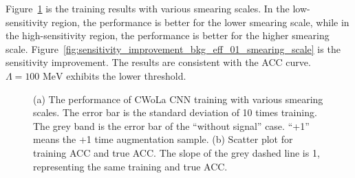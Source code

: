 \documentclass[12pt]{article}
\begin{document}
		Figure~\ref{fig:cwola_cnn_training_performance_smearing_scale} is the training results with various smearing scales. In the low-sensitivity region, the performance is better for the lower smearing scale, while in the high-sensitivity region, the performance is better for the higher smearing scale. Figure~\ref{fig:sensitivity_improvement_bkg_eff_01_smearing_scale} is the sensitivity improvement. The results are consistent with the ACC curve. $\Lambda = \text{100 MeV}$ exhibits the lower threshold.
		\begin{figure}[htpb]
			\centering
			\caption{(a) The performance of CWoLa CNN training with various smearing scales. The error bar is the standard deviation of 10 times training. The grey band is the error bar of the ``without signal'' case. ``+1'' means the +1 time augmentation sample. (b) Scatter plot for training ACC and true ACC. The slope of the grey dashed line is 1, representing the same training and true ACC.}
			\label{fig:cwola_cnn_training_performance_smearing_scale}
		\end{figure}
\end{document}
